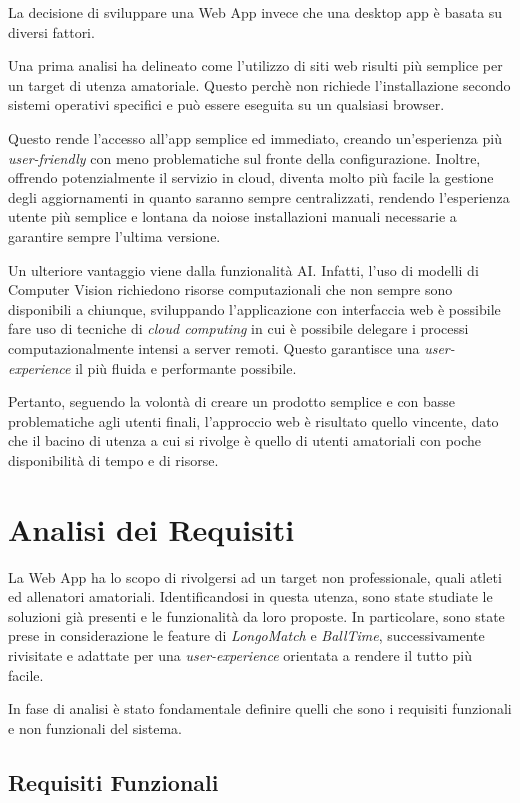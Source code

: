 La decisione di sviluppare una Web App invece che una desktop app è basata su diversi fattori.

Una prima analisi ha delineato come l'utilizzo di siti web risulti più semplice per un target di utenza amatoriale. Questo perchè non richiede l'installazione secondo sistemi operativi specifici e può essere eseguita su un qualsiasi browser.

Questo rende l'accesso all'app semplice ed immediato, creando un'esperienza più \textit{user-friendly} con meno problematiche sul fronte della configurazione. Inoltre, offrendo potenzialmente il servizio in cloud, diventa molto più facile la gestione degli aggiornamenti in quanto saranno sempre centralizzati, rendendo l'esperienza utente più semplice e lontana da noiose installazioni manuali necessarie a garantire sempre l'ultima versione.


Un ulteriore vantaggio viene dalla funzionalità AI. Infatti, l'uso di modelli di Computer Vision richiedono risorse computazionali che non sempre sono disponibili a chiunque, sviluppando l'applicazione con interfaccia web  è possibile fare uso di tecniche di \textit{cloud computing} in cui è possibile delegare i processi computazionalmente intensi a server remoti. Questo garantisce una \textit{user-experience} il più fluida e performante possibile.

Pertanto, seguendo la volontà di creare un prodotto semplice e con basse problematiche agli utenti finali, l'approccio web è risultato quello vincente, dato che il bacino di utenza a cui si rivolge è quello di utenti amatoriali con poche disponibilità di tempo e di risorse. 

\section{Analisi dei Requisiti}
\label{sec:requisiti}

La Web App ha lo scopo di rivolgersi ad un target non professionale, quali atleti ed allenatori amatoriali. Identificandosi in questa utenza, sono state studiate le soluzioni già presenti e le funzionalità da loro proposte. In particolare, sono state prese in considerazione le feature di \textit{LongoMatch} e \textit{BallTime}, successivamente rivisitate e adattate per una \textit{user-experience} orientata a rendere il tutto più facile. 

\noindent In fase di analisi è stato fondamentale definire quelli che sono i requisiti funzionali e non funzionali del sistema.
\subsection{Requisiti Funzionali}
\label{subsec:requisiti_funzionali}

